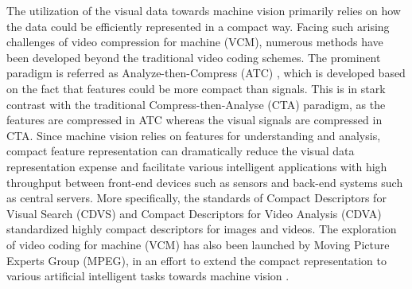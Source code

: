 \documentclass[transmag]{IEEEtran}
\begin{document}
The utilization of the visual data towards machine vision primarily relies on how the data could be efficiently represented in a compact way. Facing such arising challenges of video compression for machine (VCM), numerous methods have been developed beyond the traditional video coding schemes. The prominent paradigm is referred as Analyze-then-Compress (ATC) \cite{redondi2013compress}, which is developed based on the fact that features could be more compact than signals. This is in stark contrast with the traditional Compress-then-Analyse (CTA) paradigm, as the features are compressed in ATC whereas the visual signals are compressed in CTA. 
Since machine vision relies on features for understanding and analysis, compact feature representation can dramatically reduce the visual data representation expense and facilitate various intelligent applications with high throughput between front-end devices such as sensors and back-end systems such as central servers. More specifically, the standards of Compact Descriptors for Visual Search (CDVS) \cite{duan2015overview} and Compact Descriptors for Video Analysis (CDVA) \cite{duan2018compact} standardized highly compact descriptors for images and videos. The exploration of video coding for machine (VCM) has also been launched by Moving Picture Experts Group (MPEG), in an effort to extend the compact representation to various artificial intelligent tasks towards machine vision \cite{xia2020emerging}. 
\end{document}
